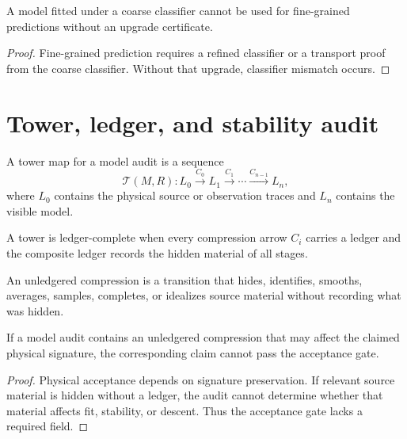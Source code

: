 \begin{corollary}
\label{cor:coarse-fit-not-fine-conclusions}
A model fitted under a coarse classifier cannot be used for fine-grained predictions without an upgrade certificate.
\end{corollary}

\begin{proof}
Fine-grained prediction requires a refined classifier or a transport proof from the coarse classifier. Without that upgrade, classifier mismatch occurs.
\end{proof}

\section{Tower, ledger, and stability audit}
\label{sec:tower-ledger-stability-audit}

\begin{definition}
\label{def:tower-map-audit}
A tower map for a model audit is a sequence
$$
\mathcal T(M,R):
L_0
\xrightarrow{C_0}
L_1
\xrightarrow{C_1}
\cdots
\xrightarrow{C_{n-1}}
L_n,
$$
where $L_0$ contains the physical source or observation traces and $L_n$ contains the visible model.
\end{definition}

\begin{definition}
\label{def:ledger-complete-tower-audit}
A tower is ledger-complete when every compression arrow $C_i$ carries a ledger and the composite ledger records the hidden material of all stages.
\end{definition}

\begin{definition}
\label{def:unledgered-compression-audit}
An unledgered compression is a transition that hides, identifies, smooths, averages, samples, completes, or idealizes source material without recording what was hidden.
\end{definition}

\begin{theorem}
\label{thm:unledgered-compression-blocks-acceptance}
If a model audit contains an unledgered compression that may affect the claimed physical signature, the corresponding claim cannot pass the acceptance gate.
\end{theorem}

\begin{proof}
Physical acceptance depends on signature preservation. If relevant source material is hidden without a ledger, the audit cannot determine whether that material affects fit, stability, or descent. Thus the acceptance gate lacks a required field.
\end{proof}

